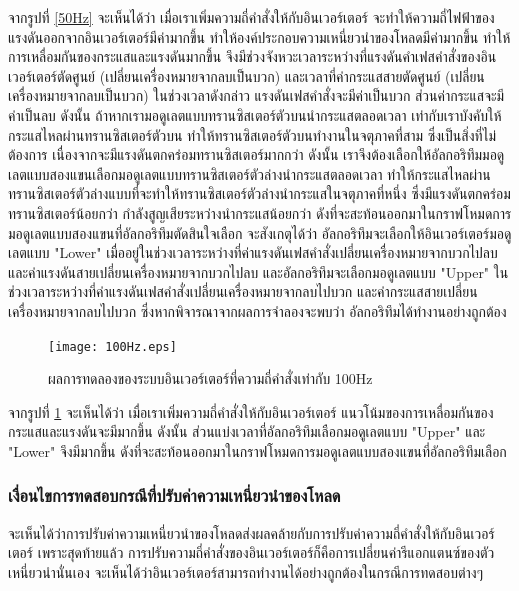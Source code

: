 \documentclass[11pt,a4paper]{article}
\begin{document}
จากรูปที่ \ref{50Hz} จะเห็นได้ว่า เมื่อเราเพิ่มความถี่คำสั่งให้กับอินเวอร์เตอร์ จะทำให้ความถี่ไฟฟ้าของแรงดันออกจากอินเวอร์เตอร์มีค่ามากขึ้น ทำให้องค์ประกอบความเหนี่ยวนำของโหลดมีค่ามากขึ้น ทำให้การเหลื่อมกันของกระแสและแรงดันมากขึ้น จึงมีช่วงจังหวะเวลาระหว่างที่แรงดันคำเฟสคำสั่งของอินเวอร์เตอร์ตัดศูนย์ (เปลี่ยนเครื่องหมายจากลบเป็นบวก) และเวลาที่ค่ากระแสสายตัดศูนย์ (เปลี่ยนเครื่องหมายจากลบเป็นบวก) ในช่วงเวลาดังกล่าว แรงดันเฟสคำสั่งจะมีค่าเป็นบวก ส่วนค่ากระแสจะมีค่าเป็นลบ ดังนั้น ถ้าหากเรามอดูเลตแบบทรานซิสเตอร์ตัวบนนำกระแสตลอดเวลา เท่ากับเราบังคับให้กระแสไหลผ่านทรานซิสเตอร์ตัวบน ทำให้ทรานซิสเตอร์ตัวบนทำงานในจตุภาคที่สาม ซึ่งเป็นสิ่งที่ไม่ต้องการ เนื่องจากจะมีแรงดันตกคร่อมทรานซิสเตอร์มากกว่า ดังนั้น เราจึงต้องเลือกให้อัลกอริทึมมอดูเลตแบบสองแขนเลือกมอดูเลตแบบทรานซิสเตอร์ตัวล่างนำกระแสตลอดเวลา ทำให้กระแสไหลผ่านทรานซิสเตอร์ตัวล่างแบบที่จะทำให้ทรานซิสเตอร์ตัวล่างนำกระแสในจตุภาคที่หนึ่ง ซึ่งมีแรงดันตกคร่อมทรานซิสเตอร์น้อยกว่า กำลังสูญเสียระหว่างนำกระแสน้อยกว่า ดังที่จะสะท้อนออกมาในกราฟโหมดการมอดูเลตแบบสองแขนที่อัลกอริทึมตัดสินใจเลือก จะสังเกตุได้ว่า อัลกอริทึมจะเลือกให้อินเวอร์เตอร์มอดูเลตแบบ "Lower" เมื่ออยู่ในช่วงเวลาระหว่างที่ค่าแรงดันเฟสคำสั่งเปลี่ยนเครื่องหมายจากบวกไปลบ และค่าแรงดันสายเปลี่ยนเครื่องหมายจากบวกไปลบ และอัลกอริทึมจะเลือกมอดูเลตแบบ "Upper" ในช่วงเวลาระหว่างที่ค่าแรงดันเฟสคำสั่งเปลี่ยนเครื่องหมายจากลบไปบวก และค่ากระแสสายเปลี่ยนเครื่องหมายจากลบไปบวก ซึ่งหากพิจารณาจากผลการจำลองจะพบว่า อัลกอริทึมได้ทำงานอย่างถูกต้อง

\begin{figure}[H]
    \centering
    \texttt{[image: 100Hz.eps]}
    \caption{ผลการทดลองของระบบอินเวอร์เตอร์ที่ความถี่คำสั่งเท่ากับ 100Hz}
    \label{100Hz}
\end{figure}

จากรูปที่ \ref{100Hz} จะเห็นได้ว่า เมื่อเราเพิ่มความถี่คำสั่งให้กับอินเวอร์เตอร์ แนวโน้มของการเหลื่อมกันของกระแสและแรงดันจะมีมากขึ้น ดังนั้น ส่วนแบ่งเวลาที่อัลกอริทึมเลือกมอดูเลตแบบ "Upper" และ "Lower" จึงมีมากขึ้น ดังที่จะสะท้อนออกมาในกราฟโหมดการมอดูเลตแบบสองแขนที่อัลกอริทึมเลือก

\subsubsection{เงื่อนไขการทดสอบกรณีที่ปรับค่าความเหนี่ยวนำของโหลด}

จะเห็นได้ว่าการปรับค่าความเหนี่ยวนำของโหลดส่งผลคล้ายกับการปรับค่าความถี่คำสั่งให้กับอินเวอร์เตอร์ เพราะสุดท้ายแล้ว การปรับความถี่คำสั่งของอินเวอร์เตอร์ก็คือการเปลี่ยนค่ารีแอกแตนซ์ของตัวเหนี่ยวนำนั่นเอง จะเห็นได้ว่าอินเวอร์เตอร์สามารถทำงานได้อย่างถูกต้องในกรณีการทดสอบต่างๆ
\end{document}
